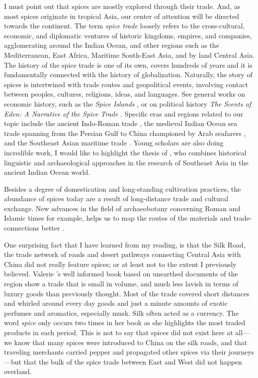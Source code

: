 I must point out that spices are mostly explored through their trade. And, as most spices originate in tropical Asia, our center of attention will be directed towards the continent. The term \textit{spice trade} loosely refers to the cross-cultural, economic, and diplomatic ventures of historic kingdoms, empires, and companies, agglomerating around the Indian Ocean, and other regions such as the Mediterranean, East Africa, Maritime South-East Asia, and by land Central Asia. The history of the spice trade is one of its own, covers hundreds of years and it is fundamentally connected with the history of globalization. Naturally, the story of spices is intertwined with trade routes and geopolitical events, involving contact between peoples, cultures, religions, ideas, and languages. See general works on economic history, such as the \textit{Spice Islands} \autocite{burnet_spice_2011}, or on political history \textit{The Scents of Eden: A Narrative of the Spice Trade} \autocite{corn_scents_1998}. Specific eras and regions related to our topic include the ancient Indo-Roman trade \autocite{sidebotham_berenike_2011,cobb_indian_2019}, the medieval Indian Ocean sea trade spanning from the Persian Gulf to China championed by Arab seafarers \autocite{hourani_arab_1975, pearson_spices_1996}, and the Southeast Asian maritime trade \autocite{donkin_between_2003,hall_history_2010,reid_southeast_1988}. Young scholars are also doing incredible work, I would like to highlight the thesis of \textcite{hoogervorst_southeast_2012}, who combines historical linguistic and archaeological approaches in the research of Southeast Asia in the ancient Indian Ocean world.

Besides a degree of domestication and long-standing cultivation practices, the abundance of spices today are a result of long-distance trade and cultural exchange. New advances in the field of archaeobotany concerning Roman and Islamic times for example, helps us to map the routes of the materials and trade-connections better \autocites[see][]{van_der_veen_roman_2015}{ van_der_veen_archaeobotany_2018}.

One surprising fact that I have learned from my reading, is that the Silk Road, the trade network of roads and desert pathways connecting Central Asia with China did not really feature spices; or at least not to the extent I previously believed. Valerie \textcite{hansen_silk_2012}'s well informed book based on unearthed documents of the region show a trade that is small in volume, and much less lavish in terms of luxury goods than previously thought. Most of the trade covered short distances and whirled around every day goods and just a minute amounts of exotic perfumes and aromatics, especially musk. Silk often acted as a currency. The word \textit{spice} only occurs two times in her book as she highlights the most traded products in each period. This is not to say that spices did not exist here at all---we know that many spices were introduced to China on the silk roads, and that traveling merchants carried pepper and propagated other spices via their journeys---but that the bulk of the spice trade between East and West did not happen overland.

